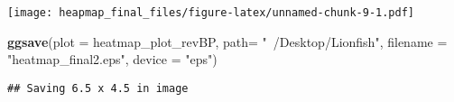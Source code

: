 \documentclass[]{article}
\newenvironment{Shaded}{\begin{snugshade}}{\end{snugshade}}
\newcommand{\KeywordTok}[1]{\textcolor[rgb]{0.13,0.29,0.53}{\textbf{#1}}}
\newcommand{\DataTypeTok}[1]{\textcolor[rgb]{0.13,0.29,0.53}{#1}}
\newcommand{\StringTok}[1]{\textcolor[rgb]{0.31,0.60,0.02}{#1}}
\newcommand{\NormalTok}[1]{#1}
\begin{document}
\texttt{[image: heapmap\_final\_files/figure-latex/unnamed-chunk-9-1.pdf]}

\begin{Shaded}
\begin{Highlighting}[]
\KeywordTok{ggsave}\NormalTok{(}\DataTypeTok{plot =}\NormalTok{ heatmap_plot_revBP, }\DataTypeTok{path=} \StringTok{"~/Desktop/Lionfish"}\NormalTok{, }\DataTypeTok{filename =} \StringTok{"heatmap_final2.eps"}\NormalTok{, }\DataTypeTok{device =} \StringTok{"eps"}\NormalTok{)}
\end{Highlighting}
\end{Shaded}

\begin{verbatim}
## Saving 6.5 x 4.5 in image
\end{verbatim}
\end{document}
